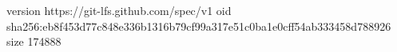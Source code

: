 version https://git-lfs.github.com/spec/v1
oid sha256:eb8f453d77c848e336b1316b79cf99a317e51c0ba1e0cff54ab333458d788926
size 174888
